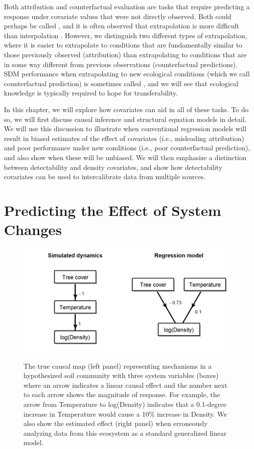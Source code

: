 Both attribution and counterfactual evaluation are tasks that require predicting a response under covariate values that were not directly observed.  Both could perhaps be called , and it is often observed that extrapolation is more difficult than interpolation \cite{roberts_cross-validation_2017}.  However, we distinguish two different types of extrapolation, where it is easier to extrapolate to conditions that are fundamentally similar to those previously observed (attribution) than extrapolating to conditions that are in some way different from previous observations (counterfactual predictions). SDM performance when extrapolating to new ecological conditions (which we call counterfactual prediction) is sometimes called , and we will see that ecological knowledge is typically required to hope for transferability.

In this chapter, we will explore how covariates can aid in all of these tasks.  To do so, we will first discuss causal inference and structural equation models in detail.  We will use this discussion to illustrate when conventional regression models will result in biased estimates of the effect of covariates (i.e., misleading attribution) and poor performance under new conditions (i.e., poor counterfactual prediction), and also show when these will be unbiased.  We will then emphasize a distinction between detectability and density covariates, and show how detectability covariates can be used to intercalibrate data from multiple sources. 

\section{Predicting the Effect of System Changes} \label{sec:Chap7_predicting_effect}

\begin{figure}[!ht]
    \caption[Causal map and regression estimates for simplified ecosystem]{The true causal map (left panel) representing mechanisms in a hypothesized soil community with three system variables (boxes) where an arrow indicates a linear causal effect and the number next to each arrow shows the magnitude of response.  For example, the arrow from Temperature to log(Density) indicates that a 0.1-degree increase in Temperature would cause a 10\% increase in Density.  We also show the estimated effect (right panel) when erroneously analyzing data from this ecosystem as a standard generalized linear model.}
    \includegraphics[width=5.5in]{Chap_7/graph.png}
    \label{fig:Chap7_causal_map}
\end{figure}

